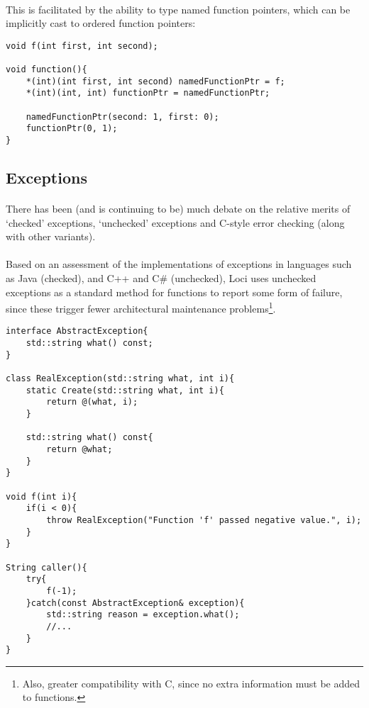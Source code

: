 \documentclass[12pt,twoside,notitlepage]{report}
\begin{document}
\paragraph{}
This is facilitated by the ability to type named function pointers, which can be implicitly cast to ordered function pointers:


\begin{lstlisting}
void f(int first, int second);

void function(){
	*(int)(int first, int second) namedFunctionPtr = f;
	*(int)(int, int) functionPtr = namedFunctionPtr;
	
	namedFunctionPtr(second: 1, first: 0);
	functionPtr(0, 1);
}
\end{lstlisting}


\clearpage

\subsection{Exceptions}

\paragraph{}
There has been (and is continuing to be) much debate on the relative merits of `checked' exceptions, `unchecked' exceptions and C-style error checking (along with other variants).

\paragraph{}
Based on an assessment of the implementations of exceptions in languages such as Java (checked), and C++ and C\# (unchecked), Loci uses unchecked exceptions as a standard method for functions to report some form of failure, since these trigger fewer architectural maintenance problems\footnote{Also, greater compatibility with C, since no extra information must be added to functions.}.


\begin{lstlisting}
interface AbstractException{
	std::string what() const;
}

class RealException(std::string what, int i){
	static Create(std::string what, int i){
		return @(what, i);
	}

	std::string what() const{
		return @what;
	}
}

void f(int i){
	if(i < 0){
		throw RealException("Function 'f' passed negative value.", i);
	}
}

String caller(){
	try{
		f(-1);
	}catch(const AbstractException& exception){
		std::string reason = exception.what();
		//...
	}
}
\end{lstlisting}
\end{document}
